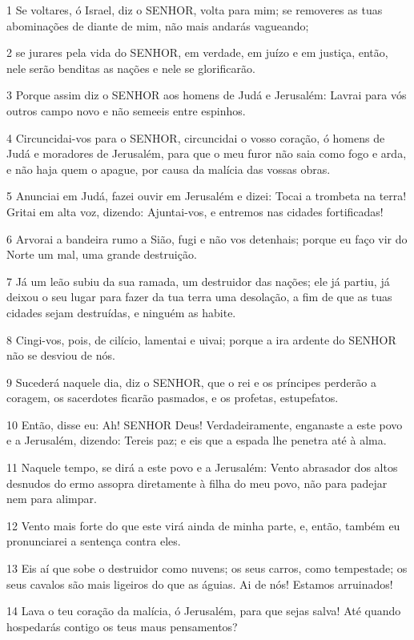\par 1 Se voltares, ó Israel, diz o SENHOR, volta para mim; se removeres as tuas abominações de diante de mim, não mais andarás vagueando;
\par 2 se jurares pela vida do SENHOR, em verdade, em juízo e em justiça, então, nele serão benditas as nações e nele se glorificarão.
\par 3 Porque assim diz o SENHOR aos homens de Judá e Jerusalém: Lavrai para vós outros campo novo e não semeeis entre espinhos.
\par 4 Circuncidai-vos para o SENHOR, circuncidai o vosso coração, ó homens de Judá e moradores de Jerusalém, para que o meu furor não saia como fogo e arda, e não haja quem o apague, por causa da malícia das vossas obras.
\par 5 Anunciai em Judá, fazei ouvir em Jerusalém e dizei: Tocai a trombeta na terra! Gritai em alta voz, dizendo: Ajuntai-vos, e entremos nas cidades fortificadas!
\par 6 Arvorai a bandeira rumo a Sião, fugi e não vos detenhais; porque eu faço vir do Norte um mal, uma grande destruição.
\par 7 Já um leão subiu da sua ramada, um destruidor das nações; ele já partiu, já deixou o seu lugar para fazer da tua terra uma desolação, a fim de que as tuas cidades sejam destruídas, e ninguém as habite.
\par 8 Cingi-vos, pois, de cilício, lamentai e uivai; porque a ira ardente do SENHOR não se desviou de nós.
\par 9 Sucederá naquele dia, diz o SENHOR, que o rei e os príncipes perderão a coragem, os sacerdotes ficarão pasmados, e os profetas, estupefatos.
\par 10 Então, disse eu: Ah! SENHOR Deus! Verdadeiramente, enganaste a este povo e a Jerusalém, dizendo: Tereis paz; e eis que a espada lhe penetra até à alma.
\par 11 Naquele tempo, se dirá a este povo e a Jerusalém: Vento abrasador dos altos desnudos do ermo assopra diretamente à filha do meu povo, não para padejar nem para alimpar.
\par 12 Vento mais forte do que este virá ainda de minha parte, e, então, também eu pronunciarei a sentença contra eles.
\par 13 Eis aí que sobe o destruidor como nuvens; os seus carros, como tempestade; os seus cavalos são mais ligeiros do que as águias. Ai de nós! Estamos arruinados!
\par 14 Lava o teu coração da malícia, ó Jerusalém, para que sejas salva! Até quando hospedarás contigo os teus maus pensamentos?
